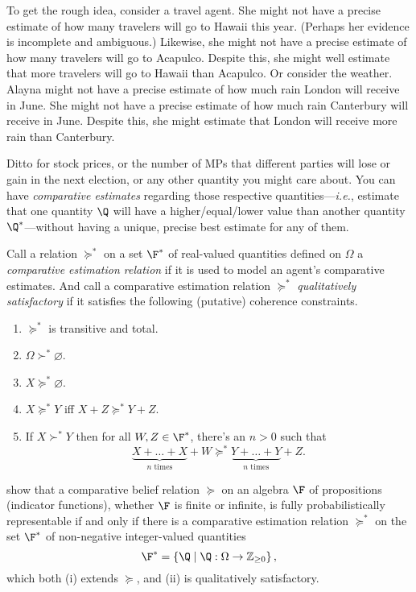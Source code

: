To get the rough idea, consider a travel agent. She might not have a precise estimate of how many travelers will go to Hawaii this year. (Perhaps her evidence is incomplete and ambiguous.) Likewise, she might not have a precise estimate of how many travelers will go to Acapulco. Despite this, she might well estimate that more travelers will go to Hawaii than Acapulco. Or consider the weather. Alayna might not have a precise estimate of how much rain London will receive in June. She might not have a precise estimate of how much rain Canterbury will receive in June. Despite this, she might estimate that London will receive more rain than Canterbury. 

Ditto for stock prices, or the number of MPs that different parties will lose or gain in the next election, or any other quantity you might care about. You can have \textit{comparative estimates} regarding those respective quantities---\textit{i.e.}, estimate that one quantity $\Q$ will have a higher/equal/lower value than another quantity $\Q^*$---without having a unique, precise best estimate for any of them.

Call a relation $\succeq^*$ on a set $\F^*$ of real-valued quantities defined on $\Omega$ a \textit{comparative estimation relation} if it is used to model an agent's comparative estimates. And call a comparative estimation relation $\succeq^*$ \textit{qualitatively satisfactory} if it satisfies the following (putative) coherence constraints.
\begin{enumerate}
\item $\succeq^*$ is transitive and total.
\item $\Omega\succ^*\varnothing$.
\item $X\succeq^*\varnothing$.
\item $X\succeq^* Y$ iff $X+Z\succeq^* Y+Z$.
\item If $X\succ^* Y$ then for all $W,Z\in\F^*$, there's an $n>0$ such that 
$$ \underbrace{X+\hdots+X}_{\text{$n$ times}}+W\succeq^* \underbrace{Y+\hdots+Y}_{\text{$n$ times}}+Z. $$
\end{enumerate}
\citet{Suppes1976} show that a comparative belief relation $\succeq$ on an algebra $\F$ of propositions (indicator functions), whether $\F$ is finite or infinite, is fully probabilistically representable if and only if there is a comparative estimation relation $\succeq^*$ on the set $\F^*$ of non-negative integer-valued quantities
$$ \F^*=\left\{\Q \mathrel{|} \Q:\Omega\rightarrow\mathbb{Z}_{\geq0}\right\}, $$
which both (i) extends $\succeq$, and (ii) is qualitatively satisfactory.

